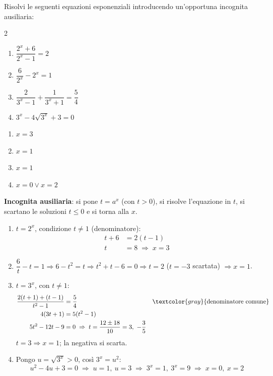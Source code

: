 
\begin{question}[ID=3.10, subtitle={Equazioni con sostituzione: forme fratte e radicali}, difficulty=difficile, tags={equazioni, esponenziali, sostituzione, fratte}]
Risolvi le seguenti equazioni esponenziali introducendo un'opportuna incognita ausiliaria:
\begin{center}\begin{minipage}{0.92\linewidth}
\begin{multicols}{2}
\begin{enumerate}[leftmargin=3.2cm]
\item $\dfrac{2^{x}+6}{2^{x}-1} = 2$
\item $\dfrac{6}{2^{x}} - 2^{x} = 1$
\item $\dfrac{2}{3^{x}-1} + \dfrac{1}{3^{x}+1} = \dfrac{5}{4}$
\item $3^{x} - 4\sqrt{3^{x}} + 3 = 0$
\end{enumerate}
\end{multicols}
\end{minipage}\end{center}
\begin{solution}
\begin{enumerate}
    \item $x=3$
    \item $x=1$
    \item $x=1$
    \item $x=0\vee x=2$
\end{enumerate}
\end{solution}
\begin{explanation}
\textbf{Incognita ausiliaria}: si pone $t=a^x$ (con $t>0$), si risolve l'equazione in $t$, si scartano le soluzioni $t\leq0$ e si torna alla $x$.
\begin{enumerate}
    \item $t=2^x$, condizione $t\neq1$ (denominatore):
    \[\begin{aligned}
    t+6 &= 2(t-1)\\
    t &= 8 \;\Rightarrow\; x=3
    \end{aligned}\]
    \item $\dfrac6t-t=1 \Rightarrow 6-t^2=t \Rightarrow t^2+t-6=0 \Rightarrow t=2$ ($t=-3$ scartata) $\Rightarrow x=1$.
    \item $t=3^x$, con $t\neq1$:
    \[\begin{aligned}
    \dfrac{2(t+1)+(t-1)}{t^2-1} &= \dfrac54 && \textcolor{gray}{\text{denominatore comune}}\\
    4(3t+1) &= 5(t^2-1)\\
    5t^2-12t-9 &= 0 \;\Rightarrow\; t=\dfrac{12\pm18}{10}=3,\ -\dfrac35
    \end{aligned}\]
    $t=3 \Rightarrow x=1$; la negativa si scarta.
    \item Pongo $u=\sqrt{3^x}>0$, così $3^x=u^2$:
    \[ u^2-4u+3=0 \;\Rightarrow\; u=1,\ u=3 \;\Rightarrow\; 3^x=1,\ 3^x=9 \;\Rightarrow\; x=0,\ x=2 \]
\end{enumerate}
\end{explanation}
\end{question}

